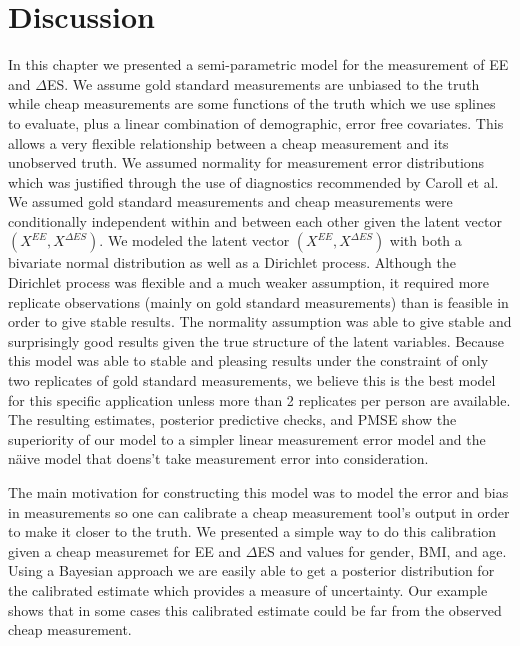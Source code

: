 \documentclass[11pt]{article}\usepackage[]{graphicx}\usepackage[]{color}
\begin{document}
  
  
\section{Discussion}

In this chapter we presented a semi-parametric model for the measurement of EE and $\Delta$ES. We assume gold standard measurements are unbiased to the truth while cheap measurements are some functions of the truth which we use splines to evaluate, plus a linear combination of demographic, error free covariates. This allows a very flexible relationship between a cheap measurement and its unobserved truth. We assumed normality for measurement error distributions which was justified through the use of diagnostics recommended by Caroll et al. We assumed gold standard measurements and cheap measurements were conditionally independent within and between each other given the latent vector $(X^{EE},X^{\Delta ES})$. We modeled the latent vector $(X^{EE},X^{\Delta ES})$ with both a bivariate normal distribution as well as a Dirichlet process. Although the Dirichlet process was flexible and a much weaker assumption, it required more replicate observations (mainly on gold standard measurements) than is feasible in order to give stable results. The normality assumption was able to give stable and surprisingly good results given the true structure of the latent variables. Because this model was able to stable and pleasing results under the constraint of only two replicates of gold standard measurements, we believe this is the best model for this specific application unless more than 2 replicates per person are available. The resulting estimates, posterior predictive checks, and PMSE show the superiority of our model to a simpler linear measurement error model and the n{\"a}ive model that doens't take measurement error into consideration. 

The main motivation for constructing this model was to model the error and bias in measurements so one can calibrate a cheap measurement tool's output in order to make it closer to the truth. We presented a simple way to do this calibration given a cheap measuremet for EE and $\Delta$ES and values for gender, BMI, and age. Using a Bayesian approach we are easily able to get a posterior distribution for the calibrated estimate which provides a measure of uncertainty. Our example shows that in some cases this calibrated estimate could be far from the observed cheap measurement. 
\end{document}
